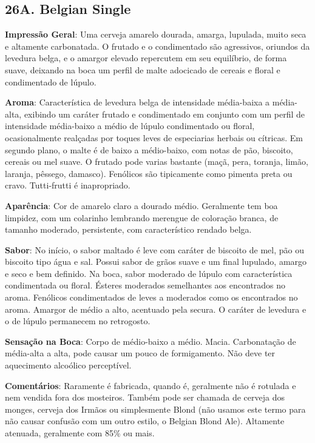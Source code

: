 \subsection*{26A. Belgian Single}
\textbf{Impressão Geral}: Uma cerveja amarelo dourada, amarga, lupulada, muito seca e altamente carbonatada. O frutado e o condimentado são agressivos, oriundos da levedura belga, e o amargor elevado repercutem em seu equilíbrio, de forma suave, deixando na boca um perfil de malte adocicado de cereais e floral e condimentado de lúpulo.

\textbf{Aroma}: Característica de levedura belga de intensidade média-baixa a média-alta, exibindo um caráter frutado e condimentado em conjunto com um perfil de intensidade média-baixo a médio de lúpulo condimentado ou floral, ocasionalmente realçadas por toques leves de especiarias herbais ou cítricas. Em segundo plano, o malte é de baixo a médio-baixo, com notas de pão, biscoito, cereais ou mel suave. O frutado pode varias bastante (maçã, pera, toranja, limão, laranja, pêssego, damasco). Fenólicos são tipicamente como pimenta preta ou cravo. Tutti-frutti é inapropriado.

\textbf{Aparência}: Cor de amarelo claro a dourado médio. Geralmente tem boa limpidez, com um colarinho lembrando merengue de coloração branca, de tamanho moderado, persistente, com característico rendado belga.

\textbf{Sabor}: No início, o sabor maltado é leve com caráter de biscoito de mel, pão ou biscoito tipo água e sal. Possui sabor de grãos suave e um final lupulado, amargo e seco e bem definido. Na boca, sabor moderado de lúpulo com característica condimentada ou floral. Ésteres moderados semelhantes aos encontrados no aroma. Fenólicos condimentados de leves a moderados como os encontrados no aroma. Amargor de médio a alto, acentuado pela secura. O caráter de levedura e o de lúpulo permanecem no retrogosto.

\textbf{Sensação na Boca}: Corpo de médio-baixo a médio. Macia. Carbonatação de média-alta a alta, pode causar um pouco de formigamento. Não deve ter aquecimento alcoólico perceptível.

\textbf{Comentários}: Raramente é fabricada, quando é, geralmente não é rotulada e nem vendida fora dos mosteiros. Também pode ser chamada de cerveja dos monges, cerveja dos Irmãos ou simplesmente Blond (não usamos este termo para não causar confusão com um outro estilo, o Belgian Blond Ale). Altamente atenuada, geralmente com 85\% ou mais.

